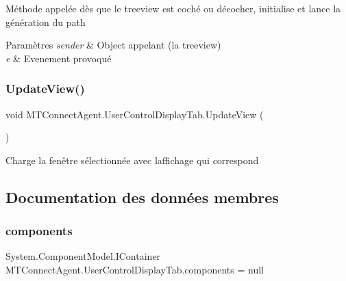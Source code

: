 Méthode appelée dès que le treeview est coché ou décocher, initialise et lance la génération du path 


\begin{DoxyParams}{Paramètres}
{\em sender} & Object appelant (la treeview)\\
\hline
{\em e} & Evenement provoqué\\
\hline
\end{DoxyParams}
\mbox{\label{class_m_t_connect_agent_1_1_user_control_display_tab_abcf66374bf792fe271d968bb035d749d}} 
\subsubsection{\texorpdfstring{Update\+View()}{UpdateView()}}
{\footnotesize\ttfamily void M\+T\+Connect\+Agent.\+User\+Control\+Display\+Tab.\+Update\+View (\begin{DoxyParamCaption}{ }\end{DoxyParamCaption})\hspace{0.3cm}{\ttfamily [inline]}}



Charge la fenêtre sélectionnée avec l\textquotesingle{}affichage qui correspond 



\subsection{Documentation des données membres}
\mbox{\label{class_m_t_connect_agent_1_1_user_control_display_tab_a69ab804e102c9f7530a0441d2dd65da6}} 
\subsubsection{\texorpdfstring{components}{components}}
{\footnotesize\ttfamily System.\+Component\+Model.\+I\+Container M\+T\+Connect\+Agent.\+User\+Control\+Display\+Tab.\+components = null\hspace{0.3cm}{\ttfamily [private]}}



